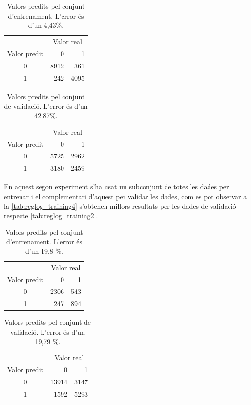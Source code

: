 \documentclass[a4paper]{article}
\begin{document}
\begin{table}[H]
	\centering
	\def\arraystretch{1.5}
	\begin{tabular}{c|rr}
		& \multicolumn{2}{c}{Valor real} \\
		Valor predit & 0 & 1 \\
		\hline
		0 & 8912 & 361 \\
		1 & 242 & 4095 \\
	\end{tabular}
	\caption{Valors predits pel conjunt d'entrenament. L'error és d'un 4,43\%.}
	\label{tab:reglog_training1}
\end{table}

\begin{table}[H]
	\centering
	\def\arraystretch{1.5}
	\begin{tabular}{c|rr}
		& \multicolumn{2}{c}{Valor real} \\
		Valor predit & 0 & 1 \\
		\hline
		0 & 5725 & 2962 \\
		1 & 3180 & 2459 \\
	\end{tabular}
	\caption{Valors predits pel conjunt de validació. L'error és d'un 42,87\%.}
	\label{tab:reglog_training2}
\end{table}

En aquest segon experiment s'ha usat un subconjunt de totes les dades per entrenar i el complementari d'aquest per validar les dades, com es pot observar a la \autoref{tab:reglog_training4} s'obtenen millors resultats per les dades de validació respecte \autoref{tab:reglog_training2}.

\begin{table}[H]
	\centering
	\def\arraystretch{1.5}
	\begin{tabular}{c|rr}
		& \multicolumn{2}{c}{Valor real} \\
		Valor predit & 0 & 1 \\
		\hline
		0 & 2306 & 543 \\
		1 &  247 & 894 \\
	\end{tabular}
	\caption{Valors predits pel conjunt d'entrenament. L'error és d'un 19,8 \%.}
	\label{tab:reglog_training3}
\end{table}

\begin{table}[H]
	\centering
	\def\arraystretch{1.5}
	\begin{tabular}{c|rr}
		& \multicolumn{2}{c}{Valor real} \\
		Valor predit & 0 & 1 \\
		\hline
		0 & 13914 & 3147 \\
		1 &  1592 & 5293 \\
	\end{tabular}
	\caption{Valors predits pel conjunt de validació. L'error és d'un 19,79 \%.}
	\label{tab:reglog_training4}
\end{table}
\end{document}
